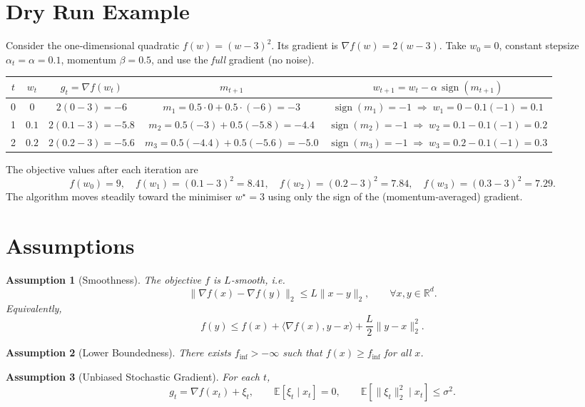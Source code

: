 \documentclass{article}
\newtheorem{assumption}{Assumption}
\newcommand{\E}{\mathbb{E}}
\newcommand{\R}{\mathbb{R}}
\begin{document}
\section*{Dry Run Example}
Consider the one‑dimensional quadratic $f(w)=(w-3)^2$.  
Its gradient is $\nabla f(w)=2(w-3)$.  
Take $w_0=0$, constant stepsize $\alpha_t=\alpha=0.1$, momentum $\beta=0.5$, and use the \emph{full} gradient (no noise).

\begin{center}
\begin{tabular}{c|c|c|c|c}
$t$ & $w_t$ & $g_t=\nabla f(w_t)$ & $m_{t+1}$ & $w_{t+1}=w_t-\alpha\,\operatorname{sign}(m_{t+1})$ \\ \hline
0 & $0$ & $2(0-3)=-6$ & $m_1=0.5\cdot0+0.5\cdot(-6)=-3$ & $\operatorname{sign}(m_1)=-1\;\Rightarrow\; w_1=0-0.1(-1)=0.1$ \\[4pt]
1 & $0.1$ & $2(0.1-3)=-5.8$ & $m_2=0.5(-3)+0.5(-5.8)=-4.4$ & $\operatorname{sign}(m_2)=-1\;\Rightarrow\; w_2=0.1-0.1(-1)=0.2$ \\[4pt]
2 & $0.2$ & $2(0.2-3)=-5.6$ & $m_3=0.5(-4.4)+0.5(-5.6)=-5.0$ & $\operatorname{sign}(m_3)=-1\;\Rightarrow\; w_3=0.2-0.1(-1)=0.3$
\end{tabular}
\end{center}

The objective values after each iteration are
\[
f(w_0)=9,\quad f(w_1)= (0.1-3)^2=8.41,\quad 
f(w_2)= (0.2-3)^2=7.84,\quad 
f(w_3)= (0.3-3)^2=7.29 .
\]
The algorithm moves steadily toward the minimiser $w^\star=3$ using only the sign of the (momentum‑averaged) gradient.

\newpage
\section*{Assumptions}
\begin{assumption}[Smoothness]\label{ass:smooth}
The objective $f$ is $L$‑smooth, i.e.
\[
\|\nabla f(x)-\nabla f(y)\|_2 \le L\|x-y\|_2,\qquad\forall x,y\in\R^{d}.
\]
Equivalently,
\[
f(y)\le f(x)+\langle\nabla f(x),y-x\rangle+\frac{L}{2}\|y-x\|_2^{2}.
\tag{2}
\]
\end{assumption}

\begin{assumption}[Lower Boundedness]\label{ass:lower}
There exists $f_{\inf}>-\infty$ such that $f(x)\ge f_{\inf}$ for all $x$.
\end{assumption}

\begin{assumption}[Unbiased Stochastic Gradient]\label{ass:unbiased}
For each $t$,
\[
g_t = \nabla f(x_t)+\xi_t,\qquad 
\E[\xi_t\mid x_t]=0,\qquad 
\E[\|\xi_t\|_2^{2}\mid x_t]\le\sigma^{2}.
\]
\end{assumption}
\end{document}
